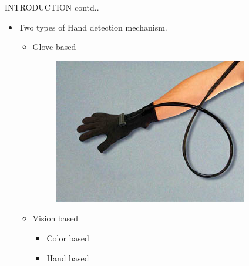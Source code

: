\documentclass{beamer}
\begin{document}
\begin{frame}{INTRODUCTION contd..}
\begin{itemize}
\item Two types of Hand detection mechanism.
\begin{itemize}
\item Glove based
\begin{figure}
\begin{center}
\includegraphics[scale=0.5]{images/glove.jpg}
\end{center}
\end{figure}
\item Vision based
\begin{itemize}
\item Color based
\vspace{.5 cm}
\item Hand based
\end{itemize}
\end{itemize}


\end{itemize}
\end{frame}
\end{document}
